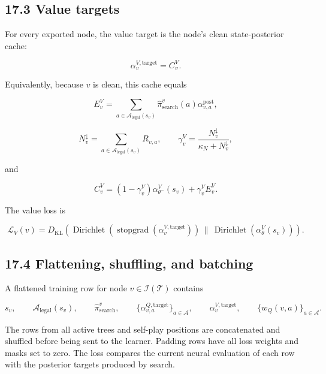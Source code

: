\documentclass[11pt]{article}
\newcommand{\Dir}{\operatorname{Dirichlet}}
\newcommand{\stopgrad}{\operatorname{stopgrad}}
\newcommand{\Tree}{\mathcal{T}}
\newcommand{\Actions}{\mathcal{A}}
\newcommand{\Legal}{\mathcal{A}_{\mathrm{legal}}}
\newcommand{\Interior}{\mathcal{I}}
\begin{document}
\subsection*{17.3 Value targets}

For every exported node, the value target is the node's clean state-posterior
cache:

\[
\alpha^{V,\mathrm{target}}_v
=
C^V_v.
\]

Equivalently, because \(v\) is clean, this cache equals

\[
E^V_v
=
\sum_{a\in\Legal(s_v)}
\hat\pi_{\mathrm{search}}^v(a)
\alpha^{\mathrm{post}}_{v,a},
\]

\[
N^\downarrow_v
=
\sum_{a\in\Legal(s_v)}R_{v,a},
\qquad
\gamma^V_v
=
\frac{N^\downarrow_v}{\kappa_N+N^\downarrow_v},
\]

and

\[
C^V_v
=
(1-\gamma^V_v)\alpha_{\theta^-}^V(s_v)
+
\gamma^V_v E^V_v.
\]

The value loss is

\[
\mathcal{L}_V(v)
=
D_{\mathrm{KL}}
\left(
\Dir
\left(
\stopgrad(\alpha^{V,\mathrm{target}}_v)
\right)
\,\|\,
\Dir
\left(
\alpha_\theta^V(s_v)
\right)
\right).
\]

\subsection*{17.4 Flattening, shuffling, and batching}

A flattened training row for node \(v\in\Interior(\Tree)\) contains

\[
s_v,
\qquad
\Legal(s_v),
\qquad
\hat\pi_{\mathrm{search}}^v,
\qquad
\{\alpha^{Q,\mathrm{target}}_{v,a}\}_{a\in\Actions},
\qquad
\alpha^{V,\mathrm{target}}_v,
\qquad
\{w_Q(v,a)\}_{a\in\Actions}.
\]

The rows from all active trees and self-play positions are concatenated and
shuffled before being sent to the learner. Padding rows have all loss weights and masks set
to zero. The loss compares the current neural evaluation of each row with the
posterior targets produced by search.
\end{document}
